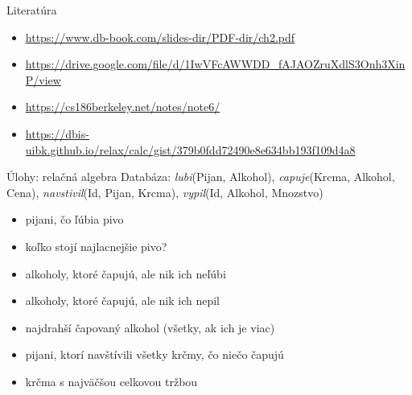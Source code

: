 \documentclass[12pt]{beamer}
\begin{document}
\begin{frame}{Literatúra}
\begin{itemize}
\item {\scriptsize\url{https://www.db-book.com/slides-dir/PDF-dir/ch2.pdf}}
\item {\scriptsize\url{https://drive.google.com/file/d/1IwVFcAWWDD_fAJAOZruXdlS3Onh3XinP/view}}
\item {\scriptsize\url{https://cs186berkeley.net/notes/note6/}}
\item {\scriptsize\url{https://dbis-uibk.github.io/relax/calc/gist/379b0fdd72490e8e634bb193f109d4a8}}
\end{itemize}
\end{frame}

\begin{frame}{Úlohy: relačná algebra}
Databáza: \emph{lubi}(Pijan, Alkohol), \emph{capuje}(Krcma, Alkohol, Cena),
\emph{navstivil}(Id, Pijan, Krcma), \emph{vypil}(Id, Alkohol, Mnozstvo)
\begin{itemize}
	\item pijani, čo ľúbia pivo
	\item koľko stojí najlacnejšie pivo?
    \item alkoholy, ktoré čapujú, ale nik ich neľúbi
    \item alkoholy, ktoré čapujú, ale nik ich nepil
	\item najdrahší čapovaný alkohol (všetky, ak ich je viac)
	\item pijani, ktorí navštívili všetky krčmy, čo niečo čapujú
    \item krčma s najväčšou celkovou tržbou
\end{itemize}
\end{frame}
\end{document}
